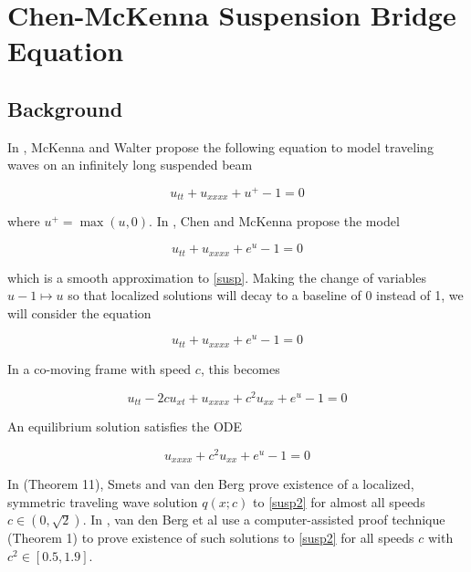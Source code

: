 \documentclass[12pt]{article}
\begin{document}
\section{Chen-McKenna Suspension Bridge Equation}

\subsection{Background}

In \cite{McKenna1990}, McKenna and Walter propose the following equation to model traveling waves on an infinitely long suspended beam

\begin{equation}\label{susp}
u_{tt} + u_{xxxx} + u^+ - 1 = 0
\end{equation}

where $u^+ = \max(u, 0)$. In \cite{Chen1997}, Chen and McKenna propose the model

\begin{equation}\label{susp2}
u_{tt} + u_{xxxx} + e^{u} - 1 = 0
\end{equation}

which is a smooth approximation to \eqref{susp}. Making the change of variables $u - 1 \mapsto u$ so that localized solutions will decay to a baseline of 0 instead of 1, we will consider the equation

\begin{equation}\label{susp3}
u_{tt} + u_{xxxx} + e^{u} - 1 = 0
\end{equation}

In a co-moving frame with speed $c$, this becomes

\begin{equation}\label{suspc}
u_{tt} - 2 c u_{x t} + u_{xxxx} + c^2 u_{xx} + e^{u} - 1 = 0
\end{equation}

An equilibrium solution satisfies the ODE

\begin{equation}\label{eqODE}
u_{xxxx} + c^2 u_{xx} + e^{u} - 1 = 0
\end{equation}

In \cite{Smets2002} (Theorem 11), Smets and van den Berg prove existence of a localized, symmetric traveling wave solution $q(x; c)$ to \eqref{susp2} for almost all speeds $c \in (0, \sqrt{2})$. In \cite{Berg2018}, van den Berg et al use a computer-assisted proof technique (Theorem 1) to prove existence of such solutions to \eqref{susp2} for all speeds $c$ with $c^2 \in [0.5, 1.9]$.\\
\end{document}

